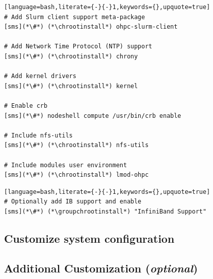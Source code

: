 \documentclass{ohpc-doc}
\newcommand{\chrootinstall}{nodeshell compute dnf -y install}
\newcommand{\groupchrootinstall}{nodeshell compute dnf -y groupinstall}
\begin{document}
\begin{lstlisting}[language=bash,literate={-}{-}1,keywords={},upquote=true]
# Add Slurm client support meta-package
[sms](*\#*) (*\chrootinstall*) ohpc-slurm-client

# Add Network Time Protocol (NTP) support
[sms](*\#*) (*\chrootinstall*) chrony

# Add kernel drivers
[sms](*\#*) (*\chrootinstall*) kernel

# Enable crb
[sms](*\#*) nodeshell compute /usr/bin/crb enable

# Include nfs-utils
[sms](*\#*) (*\chrootinstall*) nfs-utils

# Include modules user environment
[sms](*\#*) (*\chrootinstall*) lmod-ohpc
\end{lstlisting}


\begin{lstlisting}[language=bash,literate={-}{-}1,keywords={},upquote=true]
# Optionally add IB support and enable
[sms](*\#*) (*\groupchrootinstall*) "InfiniBand Support"
\end{lstlisting}

\subsection{Customize system configuration} \label{sec:master_customization}




\subsection{Additional Customization ({\em optional})} \label{sec:addl_customizations}

\end{document}
